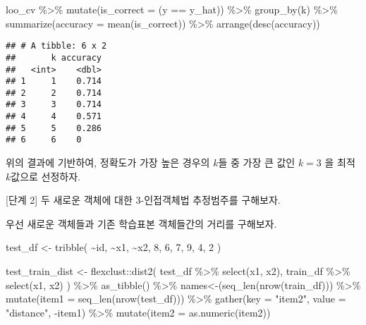\documentclass[
]{book}
\newenvironment{Shaded}{\begin{snugshade}}{\end{snugshade}}
\newcommand{\AttributeTok}[1]{\textcolor[rgb]{0.77,0.63,0.00}{#1}}
\newcommand{\DecValTok}[1]{\textcolor[rgb]{0.00,0.00,0.81}{#1}}
\newcommand{\FunctionTok}[1]{\textcolor[rgb]{0.00,0.00,0.00}{#1}}
\newcommand{\NormalTok}[1]{#1}
\newcommand{\OtherTok}[1]{\textcolor[rgb]{0.56,0.35,0.01}{#1}}
\newcommand{\SpecialCharTok}[1]{\textcolor[rgb]{0.00,0.00,0.00}{#1}}
\newcommand{\StringTok}[1]{\textcolor[rgb]{0.31,0.60,0.02}{#1}}
\begin{document}
\begin{Shaded}
\begin{Highlighting}[]
\NormalTok{loo\_cv }\SpecialCharTok{\%\textgreater{}\%}
  \FunctionTok{mutate}\NormalTok{(}\AttributeTok{is\_correct =}\NormalTok{ (y }\SpecialCharTok{==}\NormalTok{ y\_hat)) }\SpecialCharTok{\%\textgreater{}\%}
  \FunctionTok{group\_by}\NormalTok{(k) }\SpecialCharTok{\%\textgreater{}\%}
  \FunctionTok{summarize}\NormalTok{(}\AttributeTok{accuracy =} \FunctionTok{mean}\NormalTok{(is\_correct)) }\SpecialCharTok{\%\textgreater{}\%}
  \FunctionTok{arrange}\NormalTok{(}\FunctionTok{desc}\NormalTok{(accuracy))}
\end{Highlighting}
\end{Shaded}

\begin{verbatim}
## # A tibble: 6 x 2
##       k accuracy
##   <int>    <dbl>
## 1     1    0.714
## 2     2    0.714
## 3     3    0.714
## 4     4    0.571
## 5     5    0.286
## 6     6    0
\end{verbatim}

위의 결과에 기반하여, 정확도가 가장 높은 경우의 \(k\)들 중 가장 큰 값인 \(k = 3\) 을 최적 \(k\)값으로 선정하자.

{[}단계 2{]} 두 새로운 객체에 대한 3-인접객체법 추정범주를 구해보자.

우선 새로운 객체들과 기존 학습표본 객체들간의 거리를 구해보자.

\begin{Shaded}
\begin{Highlighting}[]
\NormalTok{test\_df }\OtherTok{\textless{}{-}} \FunctionTok{tribble}\NormalTok{(}
  \SpecialCharTok{\textasciitilde{}}\NormalTok{id, }\SpecialCharTok{\textasciitilde{}}\NormalTok{x1, }\SpecialCharTok{\textasciitilde{}}\NormalTok{x2,}
  \DecValTok{8}\NormalTok{, }\DecValTok{6}\NormalTok{, }\DecValTok{7}\NormalTok{,}
  \DecValTok{9}\NormalTok{, }\DecValTok{4}\NormalTok{, }\DecValTok{2}
\NormalTok{)}

\NormalTok{test\_train\_dist }\OtherTok{\textless{}{-}}\NormalTok{ flexclust}\SpecialCharTok{::}\FunctionTok{dist2}\NormalTok{(}
\NormalTok{  test\_df }\SpecialCharTok{\%\textgreater{}\%} \FunctionTok{select}\NormalTok{(x1, x2), }
\NormalTok{  train\_df }\SpecialCharTok{\%\textgreater{}\%} \FunctionTok{select}\NormalTok{(x1, x2)}
\NormalTok{) }\SpecialCharTok{\%\textgreater{}\%}
  \FunctionTok{as\_tibble}\NormalTok{() }\SpecialCharTok{\%\textgreater{}\%}
  \StringTok{\textasciigrave{}}\AttributeTok{names\textless{}{-}}\StringTok{\textasciigrave{}}\NormalTok{(}\FunctionTok{seq\_len}\NormalTok{(}\FunctionTok{nrow}\NormalTok{(train\_df))) }\SpecialCharTok{\%\textgreater{}\%}
  \FunctionTok{mutate}\NormalTok{(}\AttributeTok{item1 =} \FunctionTok{seq\_len}\NormalTok{(}\FunctionTok{nrow}\NormalTok{(test\_df))) }\SpecialCharTok{\%\textgreater{}\%}
  \FunctionTok{gather}\NormalTok{(}\AttributeTok{key =} \StringTok{"item2"}\NormalTok{, }\AttributeTok{value =} \StringTok{"distance"}\NormalTok{, }\SpecialCharTok{{-}}\NormalTok{item1) }\SpecialCharTok{\%\textgreater{}\%}
  \FunctionTok{mutate}\NormalTok{(}\AttributeTok{item2 =} \FunctionTok{as.numeric}\NormalTok{(item2))}
\end{Highlighting}
\end{Shaded}
\end{document}
